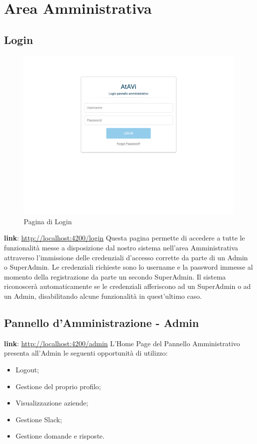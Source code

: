 \documentclass[../ManualeUtente_v1.0.0.tex]{subfiles}
\begin{document}
\section{Area Amministrativa}
	\subsection{Login}
	\begin{figure}[!h]
		\centering
		\includegraphics[scale=0.2]{Screenshot/admin-login.png}
		\caption{Pagina di Login}
	\end{figure}
	\textbf{link}: \url{http://localhost:4200/login}
	\newline
	\newline
	Questa pagina permette di accedere a tutte le funzionalità messe a disposizione dal nostro sistema nell'area Amministrativa attraverso l'immissione delle credenziali d'accesso corrette da parte di un Admin o SuperAdmin. Le credenziali richieste sono lo username e la password immesse al momento della registrazione da parte un secondo SuperAdmin. Il sistema riconoscerà automaticamente se le credenziali afferiscono ad un SuperAdmin o ad un Admin, disabilitando alcune funzionalità in quest'ultimo caso.
	\newpage
	\subsection{Pannello d'Amministrazione - Admin}
	\textbf{link}: \url{http://localhost:4200/admin}
	\newline
	\newline
	L'Home Page del Pannello Amministrativo presenta all'Admin le seguenti opportunità di utilizzo:
	\begin{itemize}
		\item{Logout};
		\item{Gestione del proprio profilo};
		\item{Visualizzazione aziende};
		\item{Gestione Slack};
		\item{Gestione domande e risposte}.
	\end{itemize}
	
\end{document}
